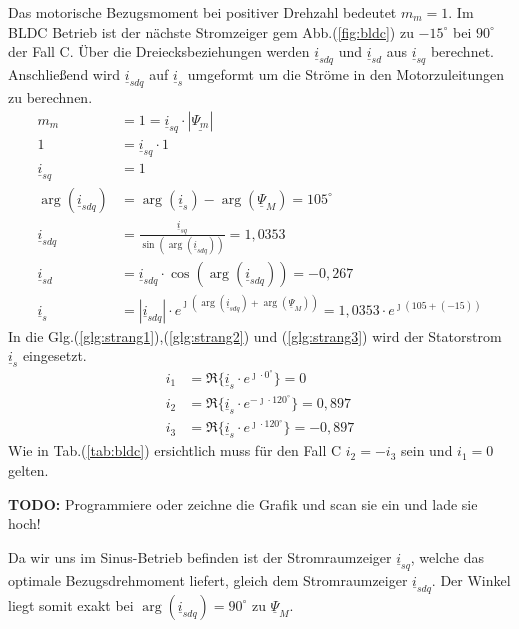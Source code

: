 \begin{solution}
\begin{compactenum}
\item Das motorische Bezugsmoment bei positiver Drehzahl bedeutet $m_m = 1$. Im BLDC Betrieb ist der nächste Stromzeiger gem Abb.(\ref{fig:bldc}) zu $-15^\circ$ bei $90^\circ$ der Fall C. Über die Dreiecksbeziehungen werden $\underline{i}_{sdq}$ und $\underline{i}_{sd}$ aus $\underline{i}_{sq}$ berechnet. Anschließend wird $\underline{i}_{sdq}$ auf $\underline{i}_{s}$ umgeformt um die Ströme in den Motorzuleitungen zu berechnen.
\begin{align}
m_m &= 1 = \underline{i}_{sq} \cdot |\underline{\Psi_m}|\\
1 &= \underline{i}_{sq} \cdot 1\\
\underline{i}_{sq} &= 1\\
\arg(\underline{i}_{sdq}) &= \arg(\underline{i}_{s}) -\arg(\underline{\Psi}_{M})=105^\circ\\
\underline{i}_{sdq} &= \frac{\underline{i}_{sq}}{\sin(\arg(\underline{i}_{sdq}))}= 1,0353\\
\underline{i}_{sd} &= \underline{i}_{sdq} \cdot \cos(\arg(\underline{i}_{sdq})) = -0,267\\
\underline{i}_{s} &= |\underline{i}_{sdq}| \cdot e^{\jmath (\arg(\underline{i}_{sdq}) + \arg(\underline{\Psi}_{M}))}= 1,0353 \cdot e^{\jmath ( 105 + (-15))}
\end{align}
In die Glg.(\ref{glg:strang1}),(\ref{glg:strang2}) und (\ref{glg:strang3}) wird der Statorstrom $\underline{i}_s$ eingesetzt.
\begin{align}
i_1 & = \Re \{ \underline{i}_s \cdot e^{\jmath \cdot 0 ^\circ} \} = 0\\
i_2 & = \Re \{ \underline{i}_s \cdot e^{-\jmath \cdot 120 ^\circ} \} = 0,897 \\
i_3 & = \Re \{ \underline{i}_s \cdot e^{\jmath \cdot 120 ^\circ} \}=  -0,897
\end{align}
Wie in Tab.(\ref{tab:bldc}) ersichtlich muss für den Fall C $i_2= -i_3$ sein und $i_1= 0$ gelten.
\item \textbf{TODO:} Programmiere oder zeichne die Grafik und scan sie ein und lade sie hoch!
\item Da wir uns im Sinus-Betrieb befinden ist der Stromraumzeiger $\underline{i}_{sq}$, welche das optimale Bezugsdrehmoment liefert, gleich dem Stromraumzeiger $\underline{i}_{sdq}$. Der Winkel liegt somit exakt bei $\arg(\underline{i}_{sdq})=90^\circ$ zu $\underline{\Psi}_M$.
\begin{align}

\end{align}
\end{compactenum}
\end{solution}
